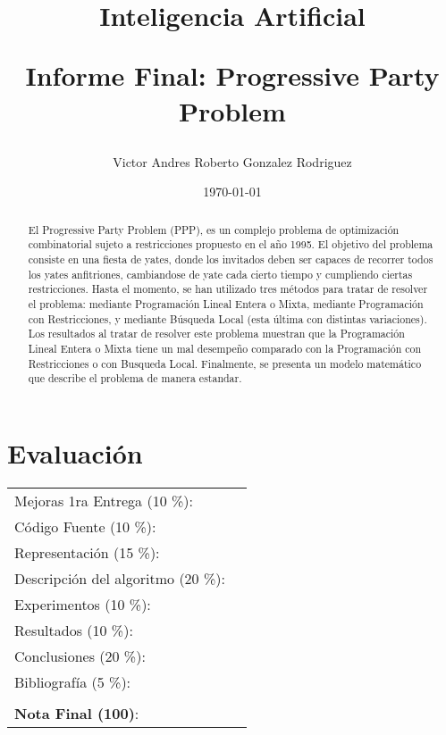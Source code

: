 \documentclass[letter, 10pt]{article}
\begin{document}
\title{Inteligencia Artificial \\ \begin{Large}Informe Final: Progressive Party Problem\end{Large}}
\author{Victor Andres Roberto Gonzalez Rodriguez}
\date{\today}
\maketitle

\section*{Evaluaci\'on}

\begin{tabular}{ll}
Mejoras 1ra Entrega (10 \%): &  \underline{\hspace{2cm}}\\
C\'odigo Fuente (10 \%): &  \underline{\hspace{2cm}}\\
Representaci\'on (15 \%):  & \underline{\hspace{2cm}} \\
Descripci\'on del algoritmo (20 \%):  & \underline{\hspace{2cm}} \\
Experimentos (10 \%):  & \underline{\hspace{2cm}} \\
Resultados (10 \%):  & \underline{\hspace{2cm}} \\
Conclusiones (20 \%): &  \underline{\hspace{2cm}}\\
Bibliograf\'ia (5 \%): & \underline{\hspace{2cm}}\\
 &  \\
\textbf{Nota Final (100)}:   & \underline{\hspace{2cm}}
\end{tabular}

\begin{abstract}
El Progressive Party Problem (PPP), es un complejo problema de optimización combinatorial sujeto a restricciones propuesto en el año 1995. El objetivo del problema consiste en una fiesta de yates, donde los invitados deben ser capaces de recorrer todos los yates anfitriones, cambiandose de yate cada cierto tiempo y cumpliendo ciertas restricciones. Hasta el momento, se han utilizado tres métodos para tratar de resolver el problema: mediante Programación Lineal Entera o Mixta, mediante Programación con Restricciones, y mediante Búsqueda Local (esta última con distintas variaciones). Los resultados al tratar de resolver este problema muestran que la Programación Lineal Entera o Mixta tiene un mal desempeño comparado con la Programación con Restricciones o con Busqueda Local. Finalmente, se presenta un modelo matemático que describe el problema de manera estandar.
\end{abstract}
\end{document}

